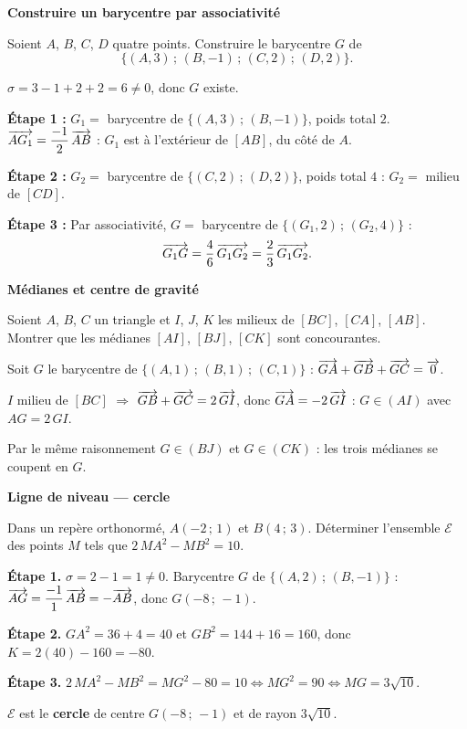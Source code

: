 \exerciceresolu
\textbf{Construire un barycentre par associativité}

Soient $A$, $B$, $C$, $D$ quatre points. Construire le barycentre $G$ de
$$\{(A,3)\,;\,(B,-1)\,;\,(C,2)\,;\,(D,2)\}.$$

\solution

$\sigma = 3 - 1 + 2 + 2 = 6 \neq 0$, donc $G$ existe.

\textbf{Étape 1 :} $G_1 =$ barycentre de $\{(A,3)\,;\,(B,-1)\}$, poids total $2$.
$\overrightarrow{AG_1} = \dfrac{-1}{2}\,\overrightarrow{AB}$ : $G_1$ est à l'extérieur de $[AB]$, du côté de $A$.

\textbf{Étape 2 :} $G_2 =$ barycentre de $\{(C,2)\,;\,(D,2)\}$, poids total $4$ :
$G_2 = $ milieu de $[CD]$.

\textbf{Étape 3 :} Par associativité, $G =$ barycentre de $\{(G_1, 2)\,;\,(G_2, 4)\}$ :
$$
\overrightarrow{G_1 G} = \frac{4}{6}\,\overrightarrow{G_1 G_2} = \frac{2}{3}\,\overrightarrow{G_1 G_2}.
$$

\exerciceresolu
\textbf{Médianes et centre de gravité}

Soient $A$, $B$, $C$ un triangle et $I$, $J$, $K$ les milieux de $[BC]$, $[CA]$, $[AB]$.
Montrer que les médianes $[AI]$, $[BJ]$, $[CK]$ sont concourantes.

\solution

Soit $G$ le barycentre de $\{(A,1)\,;\,(B,1)\,;\,(C,1)\}$ : $\overrightarrow{GA} + \overrightarrow{GB} + \overrightarrow{GC} = \overrightarrow{0}$.

$I$ milieu de $[BC]$ $\Rightarrow$ $\overrightarrow{GB}+\overrightarrow{GC} = 2\,\overrightarrow{GI}$, donc
$\overrightarrow{GA} = -2\,\overrightarrow{GI}$ : $G \in (AI)$ avec $AG = 2\,GI$.

Par le même raisonnement $G \in (BJ)$ et $G \in (CK)$ : les trois médianes
se coupent en $G$.

\exerciceresolu
\textbf{Ligne de niveau — cercle}

Dans un repère orthonormé, $A(-2\,;\,1)$ et $B(4\,;\,3)$.
Déterminer l'ensemble $\mathscr{E}$ des points $M$ tels que $2\,MA^2 - MB^2 = 10$.

\solution

\textbf{Étape 1.} $\sigma = 2 - 1 = 1 \neq 0$. Barycentre $G$ de $\{(A,2)\,;\,(B,-1)\}$ :
$\overrightarrow{AG} = \dfrac{-1}{1}\,\overrightarrow{AB} = -\overrightarrow{AB}$, donc $G(-8\,;\,-1)$.

\textbf{Étape 2.} $GA^2 = 36 + 4 = 40$ et $GB^2 = 144 + 16 = 160$, donc
$K = 2(40) - 160 = -80$.

\textbf{Étape 3.} $2\,MA^2 - MB^2 = MG^2 - 80 = 10 \iff MG^2 = 90 \iff MG = 3\sqrt{10}$.

$\mathscr{E}$ est le \textbf{cercle} de centre $G(-8\,;\,-1)$ et de rayon $3\sqrt{10}$.

